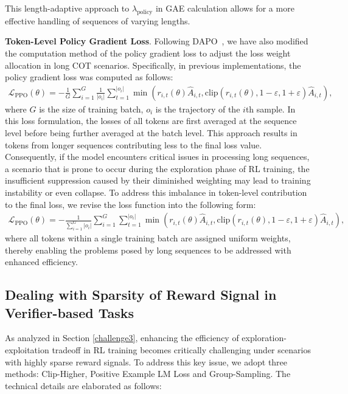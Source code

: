 This length-adaptive approach to $\lambda_{\text{policy}}$ in GAE calculation allows for a more effective handling of sequences of varying lengths. 

\textbf{Token-Level Policy Gradient Loss}.
Following DAPO~\cite{dapo}, we have also modified the computation method of the policy gradient loss to adjust the loss weight allocation in long COT scenarios. Specifically, in previous implementations, the policy gradient loss was computed as follows:
\begin{align}
\mathcal{L}_{\text{PPO}}(\theta) =- \frac{1}{G} \sum_{i = 1}^G \frac{1}{|o_i|}\sum_{t = 1}^{|o_i|} \min \left(r_{i,t}(\theta) \hat{A}_{i,t}, \text{clip}\left(r_{i,t}(\theta), 1-\varepsilon, 1 + \varepsilon\right) \hat{A}_{i,t}\right),
\end{align}
where $G$ is the size of training batch, $o_i$ is the trajectory of the $i$th sample.
In this loss formulation, the losses of all tokens are first averaged at the sequence level before being further averaged at the batch level. This approach results in tokens from longer sequences contributing less to the final loss value. Consequently, if the model encounters critical issues in processing long sequences, a scenario that is prone to occur during the exploration phase of RL training, the insufficient suppression caused by their diminished weighting may lead to training instability or even collapse. To address this imbalance in token-level contribution to the final loss, we revise the loss function into the following form:
\begin{align}
\mathcal{L}_{\text{PPO}}(\theta) =- \frac{1}{\sum_{i = 1}^G |o_i|} \sum_{i = 1}^G \sum_{t = 1}^{|o_i|} \min \left(r_{i,t}(\theta) \hat{A}_{i,t}, \text{clip}\left(r_{i,t}(\theta), 1-\varepsilon, 1 + \varepsilon\right) \hat{A}_{i,t}\right),
\end{align}
where all tokens within a single training batch are assigned uniform weights, thereby enabling the problems posed by long sequences to be addressed with enhanced efficiency.

\subsection{Dealing with Sparsity of Reward Signal in Verifier-based Tasks}
As analyzed in Section \ref{challenge3}, enhancing the efficiency of exploration-exploitation tradeoff in RL training becomes critically challenging under scenarios with highly sparse reward signals. To address this key issue, we adopt three methods: Clip-Higher, Positive Example LM Loss and Group-Sampling. The technical details are elaborated as follows:

